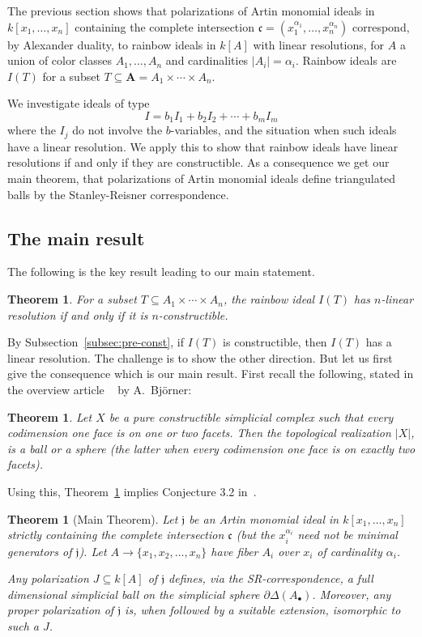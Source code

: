 \documentclass[10pt,a4paper]{article}
\newtheorem{theo}[cdrthm]{Theorem}
\theoremstyle{definition}
\theoremstyle{remark}
\theoremstyle{plain}
\newcommand{\vardel}{\partial}
\newcommand{\sus}{\subseteq}
\newcommand{\pil}{\rightarrow}
\newcommand{\ic}{{\mathfrak c}}
\newcommand{\ijfr}{{\mathfrak j}}
\newcommand{\Ab}{A_\bullet}
\newcommand{\bfA}{{\mathbf A}}
\newcommand{\Delst}{\vardel \Delta}
\begin{document}
The previous section shows that
polarizations of
Artin monomial ideals in $k[x_1, \ldots, x_n]$
containing the complete intersection $\ic = (x_1^{\alpha_1},
\ldots, x_n^{\alpha_n})$
correspond, by Alexander duality, to rainbow ideals in $k[A]$ with linear resolutions,
for $A$ a union of color classes
$A_1, \ldots, A_n$ and cardinalities $|A_i|= \alpha_i$.
Rainbow ideals
are $I(T)$ for a subset $T \sus \bfA = A_1 \times \cdots \times A_n$.

We investigate ideals of type
\[ I = b_1 I_1 + b_2 I_2 + \cdots + b_m I_m \]
where the $I_j$ do not involve the $b$-variables, and the situation
when such ideals have a linear resolution.
We apply this to show that rainbow ideals have
linear resolutions if and only if they
are constructible. As a consequence we get our main theorem,
that polarizations of Artin monomial ideals define triangulated
balls by the Stanley-Reisner correspondence.

\subsection{The main result}

The following is the key result leading to our main statement.
  
 \begin{theo} \label{thm:linres-const} For a subset
   $T \sus A_1 \times \cdots \times A_n$,
   the rainbow ideal $I(T)$ has $n$-linear resolution if and
   only if it is $n$-constructible.
  \end{theo}

  By Subsection~\ref{subsec:pre-const}, if  $I(T)$ is constructible, then
  $I(T)$ has a linear resolution. The challenge is to show the other direction.
  But let us first give the consequence which is our main result.
  First recall the following, stated in the overview article
 ~\cite[Thm.~11.4]{Bj95} by A.~Bj\"orner:


\begin{theo} \label{thm:bjorner}
Let $X$ be a pure constructible simplicial complex
    such that every codimension one face is on one or two facets.
    Then the topological realization $|X|$, is a ball or a sphere
    (the latter when every codimension one face is on exactly two
    facets).
\end{theo}
  
Using this, Theorem~\ref{thm:linres-const} implies Conjecture 3.2 in~\cite{AFL}.


\begin{theo}[Main Theorem] \label{thm:rainbow-main}
Let $\ijfr$ be an Artin monomial ideal in $k[x_1, \ldots, x_n]$
  strictly containing the
  complete intersection $\ic$ (but the $x_i^{\alpha_i}$ need not be
  minimal generators of $\ijfr$).
  Let $A \pil \{x_1, x_2, \ldots , x_n\}$  have
  fiber $A_i$ over $x_i$ of cardinality $\alpha_i$.
  
  Any polarization 
  $J \sus k[A]$ of $\ijfr$ defines, via the SR-correspondence,
  a  full dimensional  simplicial ball on the simplicial sphere $\Delst(\Ab)$.
  Moreover, any proper polarization of $\ijfr$ is,
  when followed by
  a suitable extension,
  isomorphic to such a $J$. 
\end{theo}
\end{document}
